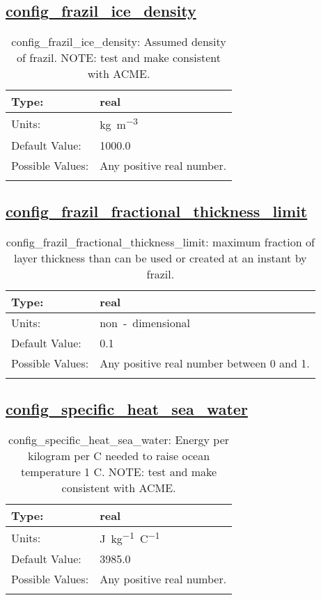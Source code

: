 \subsection[config\_frazil\_ice\_density]{\hyperref[sec:nm_tab_frazil_ice]{config\_frazil\_ice\_density}}
\label{subsec:nm_sec_config_frazil_ice_density}
\begin{center}
\begin{longtable}{| p{2.0in} || p{4.0in} |}
    \hline
    Type: & real \\
    \hline
    Units: & \si{kg.m^{-3}} \\
    \hline
    Default Value: & 1000.0 \\
    \hline
    Possible Values: & Any positive real number. \\
    \hline
    \caption{config\_frazil\_ice\_density: Assumed density of frazil. NOTE: test and make consistent with ACME.}
\end{longtable}
\end{center}
\subsection[config\_frazil\_fractional\_thickness\_limit]{\hyperref[sec:nm_tab_frazil_ice]{config\_frazil\_fractional\_thickness\_limit}}
\label{subsec:nm_sec_config_frazil_fractional_thickness_limit}
\begin{center}
\begin{longtable}{| p{2.0in} || p{4.0in} |}
    \hline
    Type: & real \\
    \hline
    Units: & \si{non-dimensional} \\
    \hline
    Default Value: & 0.1 \\
    \hline
    Possible Values: & Any positive real number between 0 and 1. \\
    \hline
    \caption{config\_frazil\_fractional\_thickness\_limit: maximum fraction of layer thickness than can be used or created at an instant by frazil.}
\end{longtable}
\end{center}
\subsection[config\_specific\_heat\_sea\_water]{\hyperref[sec:nm_tab_frazil_ice]{config\_specific\_heat\_sea\_water}}
\label{subsec:nm_sec_config_specific_heat_sea_water}
\begin{center}
\begin{longtable}{| p{2.0in} || p{4.0in} |}
    \hline
    Type: & real \\
    \hline
    Units: & \si{J.kg^{-1}.C^{-1}} \\
    \hline
    Default Value: & 3985.0 \\
    \hline
    Possible Values: & Any positive real number. \\
    \hline
    \caption{config\_specific\_heat\_sea\_water: Energy per kilogram per C needed to raise ocean temperature 1 C. NOTE: test and make consistent with ACME.}
\end{longtable}
\end{center}
